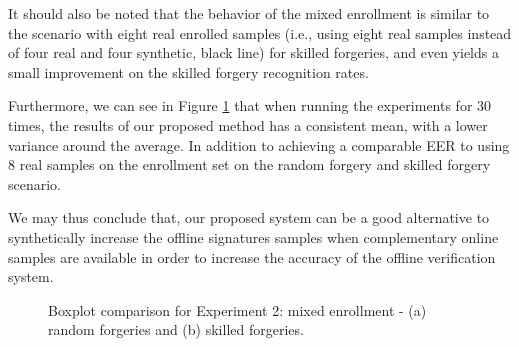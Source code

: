 It should also be noted that the behavior of the mixed enrollment is similar to the scenario with eight real enrolled samples (i.e., using eight real samples instead of
four real and four synthetic, black line) for skilled forgeries, and even yields a small improvement on the skilled forgery recognition rates. 

Furthermore, we can see in Figure \ref{fig:boxexp2} that when running the experiments for 30 times, the results of our proposed method has a consistent mean, with
a lower variance around the average. In addition to achieving a comparable EER to using 8 real samples on the enrollment set on the random forgery and skilled forgery scenario.

We may thus conclude that, our proposed system can be a good alternative to synthetically increase the offline signatures samples when complementary online samples are available in order to increase the accuracy of the offline verification system.




\begin{figure}[!htb]
\centering
\hspace*{0.8in} %
\caption{Boxplot comparison for Experiment 2: mixed enrollment - (a) random forgeries and (b) skilled forgeries. } \label{fig:boxexp2}
\end{figure}